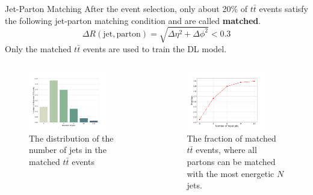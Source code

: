 \documentclass[10pt]{beamer}
\begin{document}
\begin{frame}[fragile]{Jet-Parton Matching}
    After the event selection, only about 20\% of $t\bar{t}$ events satisfy the following jet-parton matching condition and are called \textbf{matched}.
    $$\Delta R(\text{jet}, \text{parton}) = \sqrt{\Delta\eta^{2}+\Delta\phi^{2}} < 0.3$$
    Only the matched $t\bar{t}$ events are used to train the DL model.
    \begin{columns}[T,onlytextwidth]
        \begin{figure}
            \centering
            \includegraphics[width=0.8\textwidth]{figures/misc/num-jets.pdf}
            \caption{The distribution of the number of jets in the matched $t\bar{t}$ events}
        \end{figure}
        \begin{figure}
            \centering
            \includegraphics[width=0.8\textwidth]{figures/misc/frac-vs-num-jets.pdf}
            \caption{The fraction of matched $t\bar{t}$ events, where all partons can be matched with the most energetic $N$ jets.}
        \end{figure}
    \end{columns}
\end{frame}
\end{document}
